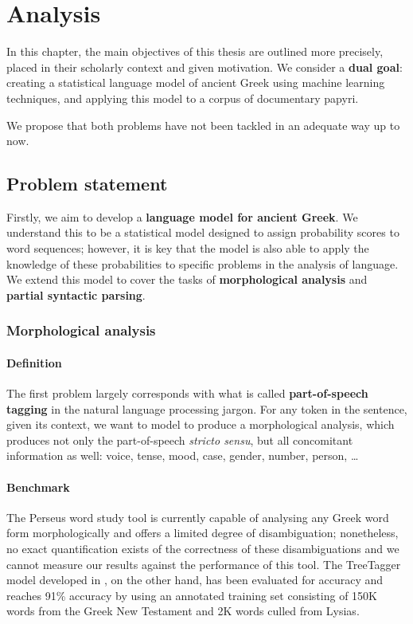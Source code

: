 
\chapter{Analysis}
\label{chp:analysis} %

In this chapter, the main objectives of this thesis are outlined more
precisely, placed in their scholarly context and given motivation. We
consider a \textbf{dual goal}: creating a statistical language model
of ancient Greek using machine learning techniques, and applying this
model to a corpus of documentary papyri.

We propose that both problems have not been tackled in an adequate way
up to now.

\section{Problem statement}
Firstly, we aim to develop a \textbf{language model for ancient
Greek}. We understand this to be a statistical model designed to
assign probability scores to word sequences; however, it is key that
the model is also able to apply the knowledge of these probabilities
to specific problems in the analysis of language. We extend this model
to cover the tasks of \textbf{morphological analysis} and
\textbf{partial syntactic parsing}.

\subsection{Morphological analysis}

\subsubsection{Definition}
The first problem largely corresponds with what is called
\textbf{part-of-speech tagging} in the natural language processing
jargon. For any token in the sentence, given its context, we want to
model to produce a morphological analysis, which produces not only the
part-of-speech \textit{stricto sensu}, but all concomitant information
as well: voice, tense, mood, case, gender, number, person, \ldots

\subsubsection{Benchmark}
The Perseus word study tool is currently capable of analysing any
Greek word form morphologically and offers a limited degree of
disambiguation; nonetheless, no exact quantification exists of the
correctness of these disambiguations and we cannot measure our results
against the performance of this tool. The TreeTagger model developed
in \cite{dik2008,dik2009}, on the other hand, has been evaluated for
accuracy and reaches 91\% accuracy by using an annotated training set
consisting of 150K words from the Greek New Testament and 2K words
culled from Lysias.

